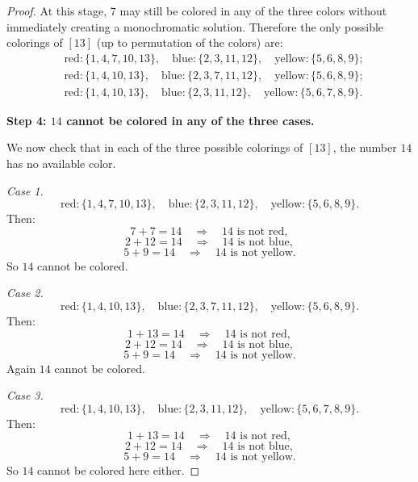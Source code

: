 \documentclass[11pt, a4paper]{ctexrep}
\begin{document}
\begin{proof}
    At this stage, $7$ may still be colored in any of the three colors without immediately creating a monochromatic solution. Therefore the only possible colorings of $[13]$ (up to permutation of the colors) are:
    \[
        \begin{aligned}
             & \text{red}: \{1,4,7,10,13\},\quad
            \text{blue}: \{2,3,11,12\},\quad
            \text{yellow}: \{5,6,8,9\};          \\[2mm]
             & \text{red}: \{1,4,10,13\},\quad
            \text{blue}: \{2,3,7,11,12\},\quad
            \text{yellow}: \{5,6,8,9\};          \\[2mm]
             & \text{red}: \{1,4,10,13\},\quad
            \text{blue}: \{2,3,11,12\},\quad
            \text{yellow}: \{5,6,7,8,9\}.
        \end{aligned}
    \]

    \medskip

    \noindent\textbf{Step 4: $14$ cannot be colored in any of the three cases.}

    We now check that in each of the three possible colorings of $[13]$, the number $14$ has no available color.

    \smallskip

    \emph{Case 1.}
    \[
        \text{red}: \{1,4,7,10,13\},\quad
        \text{blue}: \{2,3,11,12\},\quad
        \text{yellow}: \{5,6,8,9\}.
    \]
    Then:
    \[
        7+7=14 \quad\Rightarrow\quad 14\text{ is not red},
    \]
    \[
        2+12=14 \quad\Rightarrow\quad 14\text{ is not blue},
    \]
    \[
        5+9=14 \quad\Rightarrow\quad 14\text{ is not yellow}.
    \]
    So $14$ cannot be colored.

    \smallskip

    \emph{Case 2.}
    \[
        \text{red}: \{1,4,10,13\},\quad
        \text{blue}: \{2,3,7,11,12\},\quad
        \text{yellow}: \{5,6,8,9\}.
    \]
    Then:
    \[
        1+13=14 \quad\Rightarrow\quad 14\text{ is not red},
    \]
    \[
        2+12=14 \quad\Rightarrow\quad 14\text{ is not blue},
    \]
    \[
        5+9=14 \quad\Rightarrow\quad 14\text{ is not yellow}.
    \]
    Again $14$ cannot be colored.

    \smallskip

    \emph{Case 3.}
    \[
        \text{red}: \{1,4,10,13\},\quad
        \text{blue}: \{2,3,11,12\},\quad
        \text{yellow}: \{5,6,7,8,9\}.
    \]
    Then:
    \[
        1+13=14 \quad\Rightarrow\quad 14\text{ is not red},
    \]
    \[
        2+12=14 \quad\Rightarrow\quad 14\text{ is not blue},
    \]
    \[
        5+9=14 \quad\Rightarrow\quad 14\text{ is not yellow}.
    \]
    So $14$ cannot be colored here either.


\end{proof}
\end{document}
